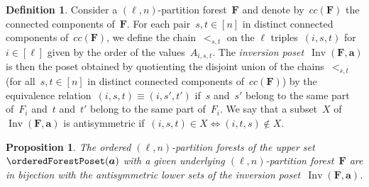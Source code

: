 \documentclass{amsart}
\newcommand{\darkblue}{\color{darkblue}} %
\newtheorem{proposition}[theorem]{Proposition}
\theoremstyle{definition}
\newtheorem{definition}[theorem]{Definition}
\renewcommand{\b}[1]{{\boldsymbol{#1}}} %
\DeclareMathOperator{\Inv}{Inv} %
\newcommand{\defn}[1]{\textsl{\darkblue #1}} %
\renewcommand{\b}[1]{\boldsymbol{#1}} %
\begin{document}
\begin{definition}
Consider a $(\ell,n)$-partition forest~$\b{F}$ and denote by~$cc(\b{F})$ the connected components of~$\b{F}$.
For each pair~$s,t \in [n]$ in distinct connected components of~$cc(\b{F})$, we define the chain~$<_{s,t}$ on the $\ell$ triples~$(i,s,t)$ for~$i \in [\ell]$ given by the order of the values~$A_{i,s,t}$.
The \defn{inversion poset}~$\Inv(\b{F}, \b{a})$ is then the poset obtained by quotienting the disjoint union of the chains~$<_{s,t}$ (for all~$s,t \in [n]$ in distinct connected components of~$cc(\b{F})$) by the equivalence relation~$(i,s,t) \equiv (i,s',t')$ if~$s$ and~$s'$ belong to the same part of~$F_i$ and~$t$ and~$t'$ belong to the same part of~$F_i$.
We say that a subset~$X$ of~$\Inv(\b{F}, \b{a})$ is antisymmetric if~$(i,s,t) \in X \iff (i,t,s) \notin X$.
\end{definition}

\begin{proposition}
\label{prop:PFtoOPF2}
The ordered $(\ell,n)$-partition forests of the upper set~$\orderedForestPoset(\b{a})$ with a given underlying $(\ell,n)$-partition forest~$\b{F}$ are in bijection with the antisymmetric lower sets of the inversion poset~$\Inv(\b{F}, \b{a})$.
\end{proposition}
\end{document}
